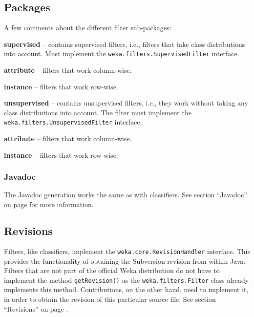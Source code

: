 \subsection{Packages}
A few comments about the different filter sub-packages:
\begin{tight_itemize}
  \item \textbf{supervised} -- contains supervised filters, i.e., filters that
take class distributions into account. Must implement the
\texttt{weka.filters.SupervisedFilter} interface.
  \begin{tight_itemize}
	\item \textbf{attribute} -- filters that work column-wise.
	\item \textbf{instance} -- filters that work row-wise.
  \end{tight_itemize}
  \item \textbf{unsupervised} -- contains unsupervised filters, i.e., they work
without taking any class distributions into account. The filter must implement
the \texttt{weka.filters.UnsupervisedFilter} interface.
  \begin{tight_itemize}
	\item \textbf{attribute} -- filters that work column-wise.
	\item \textbf{instance} -- filters that work row-wise.
  \end{tight_itemize}
\end{tight_itemize}

\subsubsection*{Javadoc}
The Javadoc generation works the same as with classifiers. See section
``Javadoc'' on page \pageref{classifier_javadoc} for more information.

\subsection{Revisions}
\label{filter_revisions}
Filters, like classifiers, implement the \texttt{weka.core.RevisionHandler}
interface. This provides the functionality of obtaining the Subversion revision
from within Java. Filters that are not part of the official Weka distribution
do not have to implement the method \texttt{getRevision()} as the
\texttt{weka.filters.Filter} class already implements this method.
Contributions, on the other hand, need to implement it, in order to
obtain the revision of this particular source file. See section ``Revisions''
on page \pageref{classifier_revisions}.

